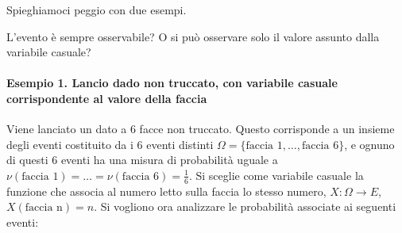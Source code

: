 \documentclass[letterpaper,10pt,italian]{jupyterBook}
\begin{document}
\sphinxAtStartPar
Spieghiamoci peggio con due esempi.

\sphinxAtStartPar
{} L’evento è sempre osservabile? O si può osservare solo il valore assunto dalla variabile casuale?


\paragraph{Esempio 1. Lancio dado non truccato, con variabile casuale corrispondente al valore della faccia}
\label{\detokenize{ch/statistics/random_variables_definition:esempio-1-lancio-dado-non-truccato-con-variabile-casuale-corrispondente-al-valore-della-faccia}}
\sphinxAtStartPar
Viene lanciato un dato a 6 facce non truccato. Questo corrisponde a un insieme degli eventi costituito da i 6 eventi distinti \(\Omega = \{ \text{faccia 1}, \dots, \text{faccia 6} \}\), e ognuno di questi 6 eventi ha una misura di probabilità uguale a \(\nu(\text{faccia 1}) = \dots = \nu(\text{faccia 6}) = \frac{1}{6}\). Si sceglie come variabile casuale la funzione che associa al numero letto sulla faccia lo stesso numero, \(X: \Omega \rightarrow E\), \(X(\text{faccia n}) = n\). Si vogliono ora analizzare le probabilità associate ai seguenti eventi:
\end{document}
